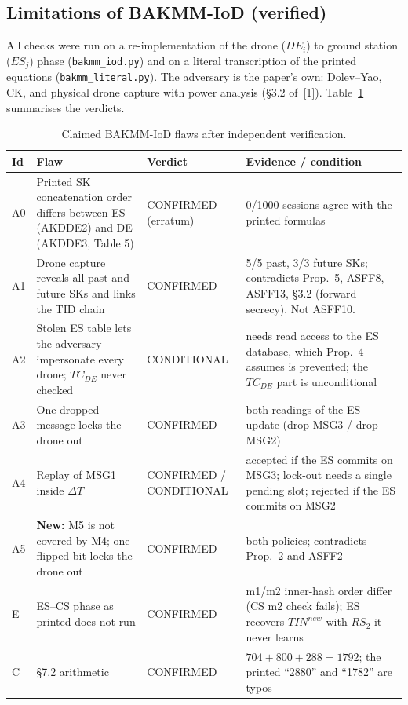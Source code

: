 
\subsection{Limitations of BAKMM-IoD (verified)}
\label{subsec:w3-limitations}

All checks were run on a re-implementation of the drone ($DE_i$) to ground station ($ES_j$) phase
(\texttt{bakmm\_iod.py}) and on a literal transcription of the printed equations (\texttt{bakmm\_literal.py}).
The adversary is the paper's own: Dolev--Yao, CK, and physical drone capture with power analysis (\S3.2 of~[1]).
Table~\ref{tab:w3-flaws} summarises the verdicts.

\begin{table}[ht]
\centering
\caption{Claimed BAKMM-IoD flaws after independent verification.}
\label{tab:w3-flaws}
\small
\begin{tabular}{p{0.9cm}p{4.6cm}p{2.3cm}p{6.2cm}}
\toprule
Id & Flaw & Verdict & Evidence / condition \\
\midrule
A0 & Printed SK concatenation order differs between ES (AKDDE2) and DE (AKDDE3, Table 5) & CONFIRMED (erratum) & 0/1000 sessions agree with the printed formulas \\
A1 & Drone capture reveals all past and future SKs and links the TID chain & CONFIRMED & 5/5 past, 3/3 future SKs; contradicts Prop.~5, ASFF8, ASFF13, \S3.2 (forward secrecy). Not ASFF10. \\
A2 & Stolen ES table lets the adversary impersonate every drone; $TC_{DE}$ never checked & CONDITIONAL & needs read access to the ES database, which Prop.~4 assumes is prevented; the $TC_{DE}$ part is unconditional \\
A3 & One dropped message locks the drone out & CONFIRMED & both readings of the ES update (drop MSG3 / drop MSG2) \\
A4 & Replay of MSG1 inside $\Delta T$ & CONFIRMED / CONDITIONAL & accepted if the ES commits on MSG3; lock-out needs a single pending slot; rejected if the ES commits on MSG2 \\
A5 & \textbf{New:} M5 is not covered by M4; one flipped bit locks the drone out & CONFIRMED & both policies; contradicts Prop.~2 and ASFF2 \\
E & ES--CS phase as printed does not run & CONFIRMED & m1/m2 inner-hash order differ (CS m2 check fails); ES recovers $TIN^{new}$ with $RS_2$ it never learns \\
C & \S7.2 arithmetic & CONFIRMED & $704+800+288=1792$; the printed ``2880'' and ``1782'' are typos \\
\bottomrule
\end{tabular}
\end{table}

